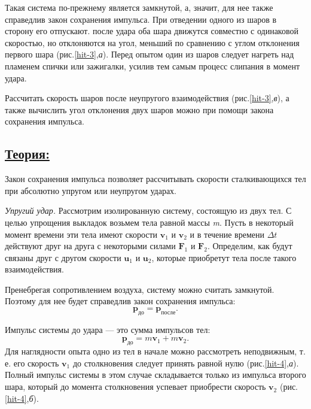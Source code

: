 \documentclass[14pt,a4paper,oneside]{extarticle}	%
\begin{document}
Такая система по-прежнему является замкнутой, а, значит, для нее также справедлив закон сохранения импульса.
При отведении одного из шаров в сторону его отпускают.
после удара оба шара движутся совместно с одинаковой скоростью, но отклоняются на угол, меньший по сравнению с углом отклонения первого шара (рис.\ref{hit-3},\textit{а}).
Перед опытом один из шаров следует нагреть над пламенем спички или зажигалки, усилив тем самым процесс слипания в момент удара.

Рассчитать скорость шаров после неупругого взаимодействия (рис.\ref{hit-3},\textit{в}), а также вычислить угол отклонения двух шаров можно при помощи закона сохранения импульса.

\subsection*{\underline{Теория:}}

Закон сохранения импульса позволяет рассчитывать скорости сталкивающихся тел при абсолютно упругом или неупругом ударах.

\textit{Упругий удар.}
Рассмотрим изолированную систему, состоящую из двух тел.
С целью упрощения выкладок возьмем тела равной массы \textit{m}.
Пусть в некоторый момент времени эти тела имеют скорости $ \textbf{v}_1 $ и  $ \textbf{v}_2 $ и в течение 
времени $ \Delta t $ действуют друг на друга с некоторыми силами $ \textbf{F}_1 $ и $ \textbf{F}_2 $.
Определим, как будут связаны друг с другом скорости $ \textbf{u}_1 $ и $ \textbf{u}_2 $, которые приобретут 
тела после такого взаимодействия.

Пренебрегая сопротивлением воздуха, систему можно считать замкнутой.
Поэтому для нее будет справедлив закон сохранения импульса:
	\begin{equation}\label{hit-1eq1}
\textbf{p}_{\text{до}}  = \textbf{p}_{\text{после}}.
\end{equation}

Импульс системы до удара — это сумма импульсов тел:
	\begin{equation}\label{hit-1eq2}
\textbf{p}_{\text{до}}  = m \textbf{v}_1 + m \textbf{v}_2.
\end{equation}
Для наглядности опыта одно из тел в начале можно рассмотреть неподвижным, т. е. его скорость $ \textbf{v}_1 $ до столкновения следует принять равной нулю (рис.\ref{hit-4},\textit{а}).
Полный импульс системы в этом случае складывается только из импульса второго шара, который до момента столкновения успевает приобрести скорость $ \textbf{v}_2 $ (рис.\ref{hit-4},\textit{б}).
\end{document}
